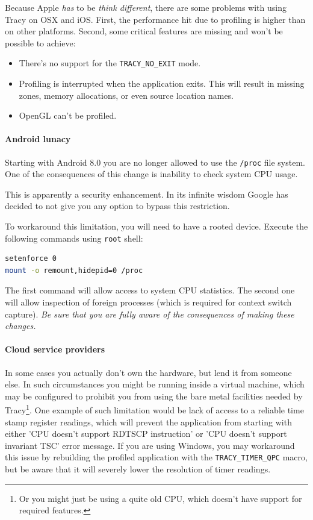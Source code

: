 \documentclass[hidelinks,titlepage,a4paper]{article}
\begin{document}
Because Apple \emph{has} to be \emph{think different}, there are some problems with using Tracy on OSX and iOS. First, the performance hit due to profiling is higher than on other platforms. Second, some critical features are missing and won't be possible to achieve:

\begin{itemize}
\item There's no support for the \texttt{TRACY\_NO\_EXIT} mode.
\item Profiling is interrupted when the application exits. This will result in missing zones, memory allocations, or even source location names.
\item OpenGL can't be profiled.
\end{itemize}

\paragraph{Android lunacy}
\label{androidlunacy}

Starting with Android 8.0 you are no longer allowed to use the \texttt{/proc} file system. One of the consequences of this change is inability to check system CPU usage.

This is apparently a security enhancement. In its infinite wisdom Google has decided to not give you any option to bypass this restriction.

To workaround this limitation, you will need to have a rooted device. Execute the following commands using \texttt{root} shell:

\begin{lstlisting}[language=sh]
setenforce 0
mount -o remount,hidepid=0 /proc
\end{lstlisting}

The first command will allow access to system CPU statistics. The second one will allow inspection of foreign processes (which is required for context switch capture). \emph{Be sure that you are fully aware of the consequences of making these changes.}

\paragraph{Cloud service providers}

In some cases you actually don't own the hardware, but lend it from someone else. In such circumstances you might be running inside a virtual machine, which may be configured to prohibit you from using the bare metal facilities needed by Tracy\footnote{Or you might just be using a quite old CPU, which doesn't have support for required features.}. One example of such limitation would be lack of access to a reliable time stamp register readings, which will prevent the application from starting with either 'CPU doesn't support RDTSCP instruction' or 'CPU doesn't support invariant TSC' error message. If you are using Windows, you may workaround this issue by rebuilding the profiled application with the \texttt{TRACY\_TIMER\_QPC} macro, but be aware that it will severely lower the resolution of timer readings.
\end{document}
